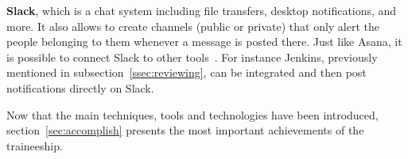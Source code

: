 \textbf{Slack}, which is a chat system including file transfers, desktop notifications, and more. It also allows to create channels (public or private) that only alert the people belonging to them whenever a message is posted there. Just like Asana, it is possible to connect Slack to other tools~\cite{slack}. For instance Jenkins, previously mentioned in {\sc subsection}~\ref{ssec:reviewing}, can be integrated and then post notifications directly on Slack.

Now that the main techniques, tools and technologies have been introduced, {\sc section}~\ref{sec:accomplish} presents the most important achievements of the traineeship.